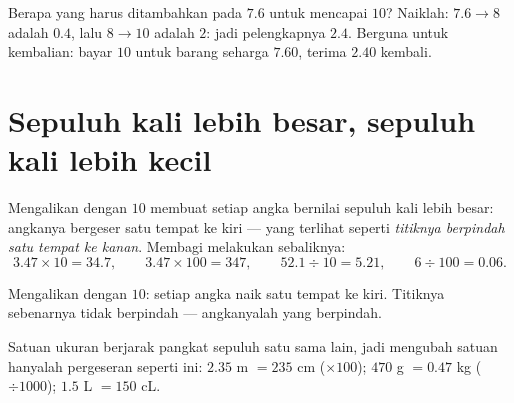 \begin{example}\label{ex:g5:decimalops:complement}
Berapa yang harus ditambahkan pada $7.6$ untuk mencapai $10$?
Naiklah: $7.6 \to 8$ adalah $0.4$, lalu $8 \to 10$ adalah $2$: jadi
pelengkapnya $2.4$. Berguna untuk kembalian: bayar $10$ untuk barang
seharga $7.60$, terima $2.40$ kembali.
\end{example}

\section{Sepuluh kali lebih besar, sepuluh kali lebih kecil}

\begin{proposition}\label{prop:g5:decimalops:shift}
Mengalikan dengan $10$ membuat setiap angka bernilai sepuluh kali
lebih besar: angkanya bergeser satu tempat ke kiri --- yang terlihat
seperti \emph{titiknya berpindah satu tempat ke kanan}. Membagi
melakukan sebaliknya:
\[
3.47 \times 10 = 34.7, \qquad
3.47 \times 100 = 347, \qquad
52.1 \div 10 = 5.21, \qquad
6 \div 100 = 0.06 .
\]
\end{proposition}
\admitted

\begin{omfigure}

{\small Mengalikan dengan $10$: setiap angka naik satu tempat ke
kiri. Titiknya sebenarnya tidak berpindah --- angkanyalah yang berpindah.}
\end{omfigure}

\begin{example}\label{ex:g5:decimalops:convert}
Satuan ukuran berjarak pangkat sepuluh satu sama lain, jadi mengubah
satuan hanyalah pergeseran seperti ini: $2.35$ m $= 235$ cm
($\times 100$); $470$ g $= 0.47$ kg ($\div 1000$); $1.5$ L $= 150$ cL.
\end{example}


